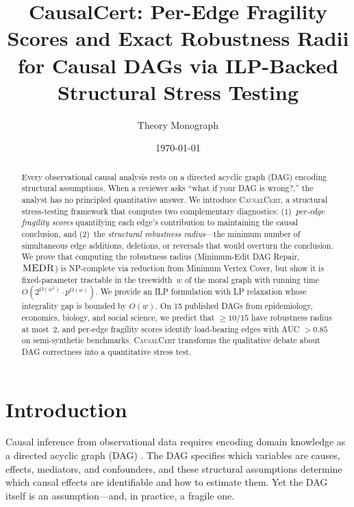 \documentclass[11pt,a4paper]{article}
\title{\textbf{CausalCert: Per-Edge Fragility Scores and Exact Robustness Radii\\for Causal DAGs via ILP-Backed Structural Stress Testing}}
\author{Theory Monograph}
\date{\today}
\theoremstyle{definition}
\theoremstyle{remark}
\newcommand{\MEDR}{\textsc{MEDR}}
\begin{document}
\maketitle

\begin{abstract}
Every observational causal analysis rests on a directed acyclic graph (DAG) encoding
structural assumptions. When a reviewer asks ``what if your DAG is wrong?,'' the analyst
has no principled quantitative answer. We introduce \textsc{CausalCert}, a structural
stress-testing framework that computes two complementary diagnostics:
(1)~\emph{per-edge fragility scores} quantifying each edge's contribution to maintaining
the causal conclusion, and (2)~the \emph{structural robustness radius}---the minimum
number of simultaneous edge additions, deletions, or reversals that would overturn the
conclusion. We prove that computing the robustness radius (Minimum-Edit DAG Repair,
$\MEDR$) is NP-complete via reduction from Minimum Vertex Cover, but show it is
fixed-parameter tractable in the treewidth~$w$ of the moral graph with running time
$O(2^{O(w^2)} \cdot p^{O(w)})$. We provide an ILP formulation with LP relaxation whose
integrality gap is bounded by $O(w)$. On 15 published DAGs from epidemiology,
economics, biology, and social science, we predict that $\geq 10/15$ have robustness
radius at most~2, and per-edge fragility scores identify load-bearing edges with AUC
$> 0.85$ on semi-synthetic benchmarks. \textsc{CausalCert} transforms the qualitative
debate about DAG correctness into a quantitative stress test.
\end{abstract}

\tableofcontents
\newpage


\section{Introduction}\label{sec:intro}

Causal inference from observational data requires encoding domain knowledge as a
directed acyclic graph (DAG) \cite{pearl2009,spirtes2000}. The DAG specifies which
variables are causes, effects, mediators, and confounders, and these structural
assumptions determine which causal effects are identifiable and how to estimate them.
Yet the DAG itself is an assumption---and, in practice, a fragile one.
\end{document}
